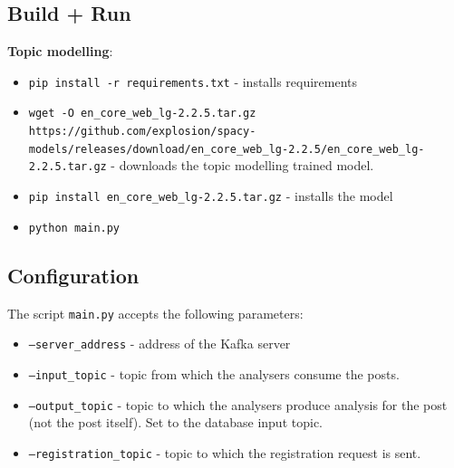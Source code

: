 \subsection{Build + Run}

\textbf{Topic modelling}:
\begin{itemize}
    \item \texttt{pip install -r requirements.txt} - installs requirements
    \item \texttt{wget -O en\_core\_web\_lg-2.2.5.tar.gz https://github.com/explosion/spacy-models/releases/download/en\_core\_web\_lg-2.2.5/en\_core\_web\_lg-2.2.5.tar.gz} - downloads the topic modelling trained model.
    \item \texttt{pip install en\_core\_web\_lg-2.2.5.tar.gz} - installs the model
    \item \texttt{python main.py}
\end{itemize}
 
\subsection{Configuration}

The script \texttt{main.py} accepts the following parameters:

\begin{itemize}
    \item \texttt{--server\_address} - address of the Kafka server
    \item \texttt{--input\_topic} - topic from which the analysers consume the posts.
    \item \texttt{--output\_topic} - topic to which the analysers produce analysis for the post (not the post itself). Set to the database input topic.
    \item \texttt{--registration\_topic} - topic to which the registration request is sent.
\end{itemize}

